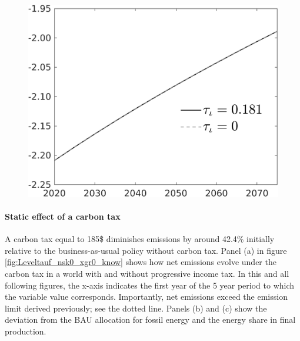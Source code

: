 \begin{figure}[h!!]
\begin{minipage}[]{0.32\textwidth}
\end{minipage}
\begin{minipage}[]{0.32\textwidth}
\includegraphics[width=1\textwidth]{../../codding_model/own_basedOnFried/optimalPol_010922_revision/figures/all_13Sept22/PerdifNoTauf_regime0_CompTaul_EY_spillover0_nsk0_xgr0_knspil0_sep0_LFlimit0_emsbase0_countec0_GovRev0_etaa0.79_lgd1.png}
\end{minipage}

\end{figure} 

\paragraph{Static effect of a carbon tax}
 A carbon tax equal to 185\$ diminishes emissions by around 42.4\% initially relative to the business-as-usual policy without carbon tax.
 Panel (a) in figure \ref{fig:Leveltauf_nsk0_xgr0_know} shows how net emissions evolve under the carbon tax in a world with and without progressive income tax. In this and all following figures, the x-axis indicates the first year of the 5 year period to which the variable value corresponds.  Importantly, net emissions exceed the emission limit  derived previously; see the dotted line. Panels (b) and (c) show the deviation from the BAU allocation for fossil energy and the energy share in final production.
 
